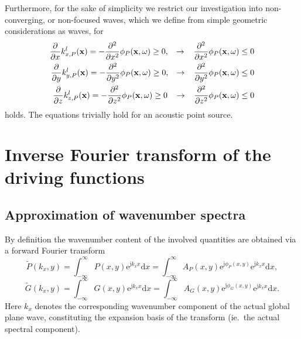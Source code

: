 \documentclass[12pt,a4paper]{article}
\newcommand{\td}{\mathrm{d}}
\newcommand{\te}{\mathrm{e}}
\newcommand{\ti}{\mathrm{j}}
\newcommand{\vx}{\mathbf{x}}
\begin{document}
Furthermore, for the sake of simplicity we restrict our investigation into non-converging, or non-focused waves, which we define from simple geometric considerations as waves, for 
\begin{eqnarray}
\frac{\partial}{\partial x} k_{x,P}^l(\vx) = -\frac{\partial^2}{\partial x^2} \phi_P (\vx,\omega) \geq 0, \hspace{3mm}\rightarrow \hspace{3mm} \frac{\partial^2}{\partial x^2} \phi_P (\vx,\omega) \leq 0\\
\frac{\partial}{\partial y} k_{y,P}^l(\vx) = -\frac{\partial^2}{\partial y^2} \phi_P (\vx,\omega) \geq 0, \hspace{3mm}\rightarrow \hspace{3mm} \frac{\partial^2}{\partial y^2} \phi_P (\vx,\omega) \leq 0\\
\frac{\partial}{\partial z} k_{z,P}^l(\vx) = -\frac{\partial^2}{\partial z^2} \phi_P (\vx,\omega) \geq 0 \hspace{3mm}\rightarrow \hspace{3mm} \frac{\partial^2}{\partial z^2} \phi_P (\vx,\omega) \leq 0
\end{eqnarray}
holds.
The equations trivially hold for an acoustic point source.

\section{Inverse Fourier transform of the driving functions}

\subsection{Approximation of wavenumber spectra}
By definition the wavenumber content of the involved quantities are obtained via a forward Fourier transform
\begin{equation}
\tilde{P}(k_x,y) = \int_{-\infty}^{\infty} P(x,y) \te^{\ti k_x x} \td x = \int_{-\infty}^{\infty} A_P(x,y) \te^{\ti \phi_P(x,y)} \te^{\ti k_x x} \td x,
\end{equation}
\begin{equation}
\tilde{G}(k_x,y) = \int_{-\infty}^{\infty} G(x,y) \te^{\ti k_x x} \td x = \int_{-\infty}^{\infty} A_G(x,y) \te^{\ti \phi_G(x,y)} \te^{\ti k_x x} \td x.
\end{equation}
Here $k_x$ denotes the corresponding wavenumber component of the actual global plane wave, constituting the expansion basis of the transform (ie.\ the actual spectral component).
\end{document}
